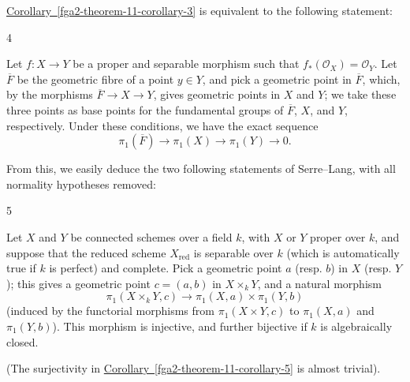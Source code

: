  \hyperref[fga2-theorem-11-corollary-3]{Corollary~\ref*{fga2-theorem-11-corollary-3}} is equivalent to the following statement:\begin{corollary}{4}\label{fga2-theorem-11-corollary-4}\skipsinglepar\par{}Let \(f\colon  X\to  Y\) be a proper and separable morphism such that \(f_*(\mathcal {O}_X)=\mathcal {O}_Y\).
    Let \(\overline {F}\) be the geometric fibre of a point \(y\in  Y\), and pick a geometric point in \(\overline {F}\), which, by the morphisms \(\overline {F}\to  X\to  Y\), gives geometric points in \(X\) and \(Y\); we take these three points as base points for the fundamental groups of \(\overline {F}\), \(X\), and \(Y\), respectively.
    Under these conditions, we have the exact sequence
    \[       \boxed {\pi _1(\overline {F}) \to  \pi _1(X) \to  \pi _1(Y) \to  0.}     \]\end{corollary}\par{}From this, we easily deduce the two following statements of Serre–Lang, with all normality hypotheses removed:\begin{corollary}{5}\label{fga2-theorem-11-corollary-5}\skipsinglepar\par{}Let \(X\) and \(Y\) be connected schemes over a field \(k\), with \(X\) or \(Y\) proper over \(k\), and suppose that the reduced scheme \(X_\mathrm {red}\) is separable over \(k\) (which is automatically true if \(k\) is perfect) and complete.
    Pick a geometric point \(a\) (resp. \(b\)) in \(X\) (resp. \(Y\)); this gives a geometric point \(c=(a,b)\) in \(X\times _kY\), and a natural morphism
    \[       \pi _1(X\times _kY,c) \to  \pi _1(X,a)\times \pi _1(Y,b)     \]
    (induced by the functorial morphisms from \(\pi _1(X\times  Y,c)\) to \(\pi _1(X,a)\) and \(\pi _1(Y,b)\)).
    This morphism is injective, and further bijective if \(k\) is algebraically closed.\end{corollary}\par{}(The surjectivity in \hyperref[fga2-theorem-11-corollary-5]{Corollary~\ref*{fga2-theorem-11-corollary-5}} is almost trivial).
